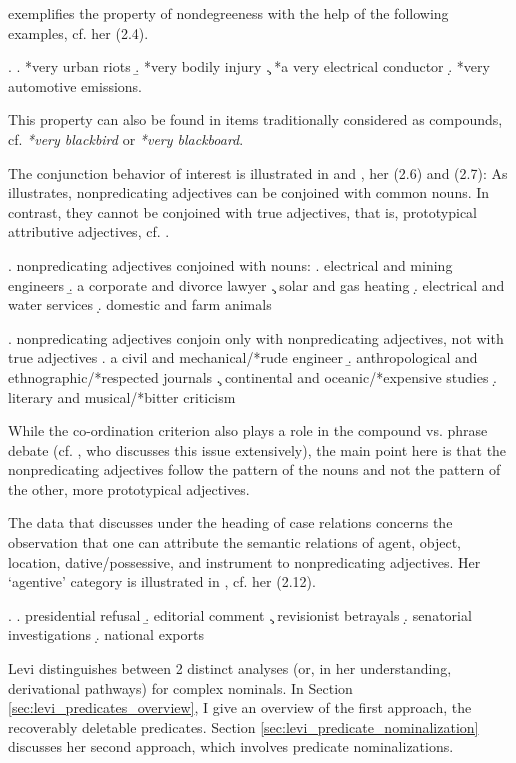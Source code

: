 \citet[19]{Levi:1978} exemplifies the property of nondegreeness with
the help of the following examples, cf. her (2.4).

\ex. \a. *very urban riots
\b. *very bodily injury
\c. *a very electrical conductor
\d. *very automotive emissions.

This property can also be found in items traditionally considered as compounds, cf. \emph{*very
  blackbird} or \emph{*very blackboard}.

The conjunction behavior of interest is illustrated in \Next and \NNext, her (2.6)
and (2.7): As \Next illustrates, nonpredicating adjectives can be
conjoined with common nouns. In contrast, they cannot be conjoined
with true adjectives, that is, prototypical attributive adjectives, cf. \NNext.

\ex. nonpredicating adjectives conjoined with nouns:
\a. electrical and mining engineers
\b. a corporate and divorce lawyer
\c. solar and gas heating
\d. electrical and water services
\d. domestic and farm animals

\ex. nonpredicating adjectives conjoin only with nonpredicating adjectives, not with
true adjectives
\a. a civil and mechanical/*rude engineer
\b. anthropological and ethnographic/*respected journals
\c. continental and oceanic/*expensive studies
\d. literary and musical/*bitter criticism

While the co-ordination criterion also plays a role in the compound
vs. phrase debate (cf. \citealt[74--76]{Bauer:1998}, who
discusses this issue extensively), the main point here is that the
nonpredicating adjectives follow the pattern of the nouns and not the
pattern of the other, more prototypical adjectives. 

The data that \citet[27--28]{Levi:1978} discusses under the heading of case
relations concerns the observation that one can attribute the semantic
relations of agent, object, location, dative/possessive, and instrument
to nonpredicating adjectives. Her `agentive'
category is illustrated in \Next, cf. her (2.12).

\ex. \a. presidential refusal
\b. editorial comment
\c. revisionist betrayals
\d. senatorial investigations
\d. national exports

Levi
distinguishes between 2 distinct analyses (or, in her understanding,
derivational pathways) for complex nominals. In
Section \ref{sec:levi_predicates_overview}, I give an overview of the first
approach, the recoverably deletable
predicates. Section \ref{sec:levi_predicate_nominalization} discusses her second
approach, which involves predicate nominalizations.

